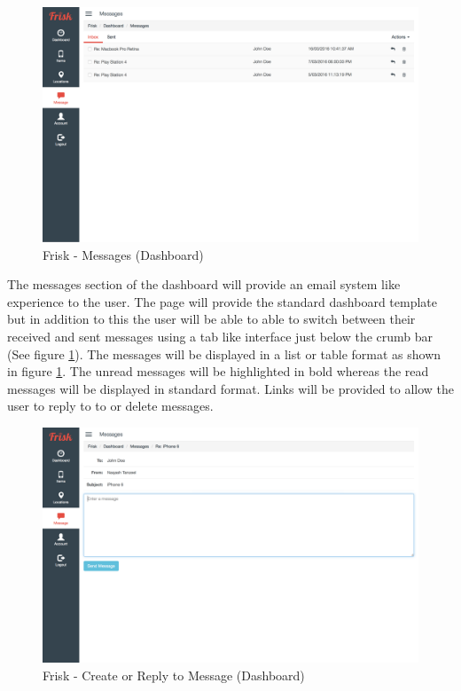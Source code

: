 \begin{figure}[H]
	\centering
	\includegraphics[width=1.0\textwidth]{images/Frisk/Dashboard_Messages}
	\caption{Frisk - Messages (Dashboard) } \label{fig:Dashboard_Messages}
\end{figure}

The messages section of the dashboard will provide an email system like experience to the user. The page will provide the standard dashboard template but in addition to this the user will be able to able to switch between their received and sent messages using a tab like interface just below the crumb bar (See figure \ref{fig:Dashboard_Messages}). The messages will be displayed in a list or table format as shown in figure \ref{fig:Dashboard_Messages}. The unread messages will be highlighted in bold whereas the read messages will be displayed in standard format. Links will be provided to allow the user to reply to to or delete messages.


\begin{figure}[H]
	\centering
	\includegraphics[width=1.0\textwidth]{images/Frisk/Dashboard_Create_Message}
	\caption{Frisk - Create or Reply to Message (Dashboard) } \label{fig:Dashboard_Create_Message}
\end{figure}

